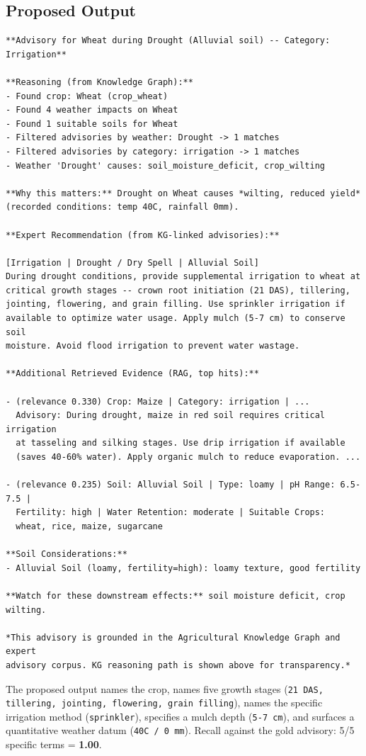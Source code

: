\documentclass[11pt,a4paper]{article}
\begin{document}
\subsection{Proposed Output}
\begin{lstlisting}
**Advisory for Wheat during Drought (Alluvial soil) -- Category: Irrigation**

**Reasoning (from Knowledge Graph):**
- Found crop: Wheat (crop_wheat)
- Found 4 weather impacts on Wheat
- Found 1 suitable soils for Wheat
- Filtered advisories by weather: Drought -> 1 matches
- Filtered advisories by category: irrigation -> 1 matches
- Weather 'Drought' causes: soil_moisture_deficit, crop_wilting

**Why this matters:** Drought on Wheat causes *wilting, reduced yield*
(recorded conditions: temp 40C, rainfall 0mm).

**Expert Recommendation (from KG-linked advisories):**

[Irrigation | Drought / Dry Spell | Alluvial Soil]
During drought conditions, provide supplemental irrigation to wheat at
critical growth stages -- crown root initiation (21 DAS), tillering,
jointing, flowering, and grain filling. Use sprinkler irrigation if
available to optimize water usage. Apply mulch (5-7 cm) to conserve soil
moisture. Avoid flood irrigation to prevent water wastage.

**Additional Retrieved Evidence (RAG, top hits):**

- (relevance 0.330) Crop: Maize | Category: irrigation | ...
  Advisory: During drought, maize in red soil requires critical irrigation
  at tasseling and silking stages. Use drip irrigation if available
  (saves 40-60% water). Apply organic mulch to reduce evaporation. ...

- (relevance 0.235) Soil: Alluvial Soil | Type: loamy | pH Range: 6.5-7.5 |
  Fertility: high | Water Retention: moderate | Suitable Crops:
  wheat, rice, maize, sugarcane

**Soil Considerations:**
- Alluvial Soil (loamy, fertility=high): loamy texture, good fertility

**Watch for these downstream effects:** soil moisture deficit, crop wilting.

*This advisory is grounded in the Agricultural Knowledge Graph and expert
advisory corpus. KG reasoning path is shown above for transparency.*
\end{lstlisting}

The proposed output names the crop, names five growth stages
(\texttt{21 DAS, tillering, jointing, flowering, grain filling}),
names the specific irrigation method (\texttt{sprinkler}), specifies
a mulch depth (\texttt{5-7 cm}), and surfaces a quantitative weather
datum (\texttt{40\textdegree C / 0 mm}). Recall against the gold
advisory: 5/5 specific terms = \textbf{1.00}.
\end{document}
